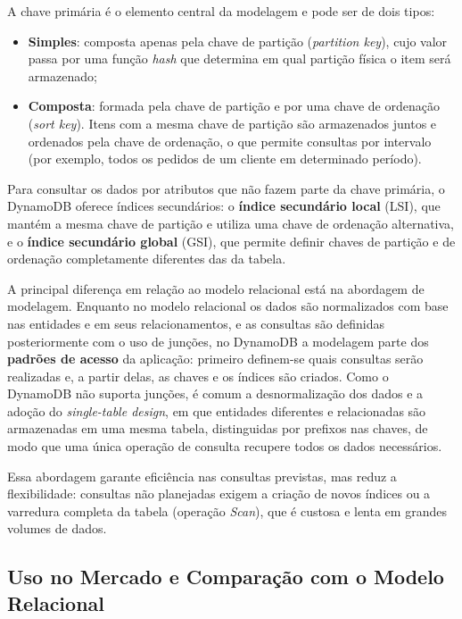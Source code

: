 \documentclass[12pt]{article}
\begin{document}
A chave primária é o elemento central da modelagem e pode ser de dois tipos:

\begin{itemize}
  \setlength{\itemsep}{0pt}
  \item \textbf{Simples}: composta apenas pela chave de partição
  (\textit{partition key}), cujo valor passa por uma função \textit{hash}
  que determina em qual partição física o item será armazenado;
  \item \textbf{Composta}: formada pela chave de partição e por uma chave de
  ordenação (\textit{sort key}). Itens com a mesma chave de partição são
  armazenados juntos e ordenados pela chave de ordenação, o que permite
  consultas por intervalo (por exemplo, todos os pedidos de um cliente em
  determinado período).
\end{itemize}

Para consultar os dados por atributos que não fazem parte da chave primária,
o DynamoDB oferece índices secundários: o \textbf{índice secundário local}
(LSI), que mantém a mesma chave de partição e utiliza uma chave de ordenação
alternativa, e o \textbf{índice secundário global} (GSI), que permite
definir chaves de partição e de ordenação completamente diferentes das da
tabela.

A principal diferença em relação ao modelo relacional está na abordagem de
modelagem. Enquanto no modelo relacional os dados são normalizados com base
nas entidades e em seus relacionamentos, e as consultas são definidas
posteriormente com o uso de junções, no DynamoDB a modelagem parte dos
\textbf{padrões de acesso} da aplicação: primeiro definem-se quais consultas
serão realizadas e, a partir delas, as chaves e os índices são criados. Como o DynamoDB não suporta junções, é comum a
desnormalização dos dados e a adoção do \textit{single-table design}, em que
entidades diferentes e relacionadas são armazenadas em uma mesma tabela,
distinguidas por prefixos nas chaves, de modo que uma única operação de
consulta recupere todos os dados necessários.

Essa abordagem garante eficiência nas consultas previstas, mas reduz a
flexibilidade: consultas não planejadas exigem a criação de novos índices ou
a varredura completa da tabela (operação \textit{Scan}), que é custosa e
lenta em grandes volumes de dados.

\subsection{Uso no Mercado e Comparação com o Modelo Relacional}
\end{document}

